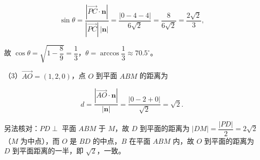 \begin{answer}
\nopagebreak[4]
\[\sin\theta=\frac{|\overrightarrow{PC}\cdot\boldsymbol n|}{|\overrightarrow{PC}|\,|\boldsymbol n|}=\frac{|0-4-4|}{6\sqrt2}=\frac{8}{6\sqrt2}=\frac{2\sqrt2}{3},\]

故 $\cos\theta=\sqrt{1-\dfrac89}=\dfrac13$，$\theta=\arccos\dfrac13\approx70.5^\circ$。

（3）$\overrightarrow{AO}=(1,2,0)$，点 $O$ 到平面 $ABM$ 的距离为

\nopagebreak[4]
\[d=\frac{|\overrightarrow{AO}\cdot\boldsymbol n|}{|\boldsymbol n|}=\frac{|0-2+0|}{\sqrt2}=\sqrt2.\]

另法核对：$PD\perp$ 平面 $ABM$ 于 $M$，故 $D$ 到平面的距离为 $|DM|=\dfrac{|PD|}{2}=2\sqrt2$（$M$ 为中点），而 $O$ 是 $BD$ 的中点，$B$ 在平面 $ABM$ 内，故 $O$ 到平面的距离为 $D$ 到平面距离的一半，即 $\sqrt2$，一致。


\end{answer}

